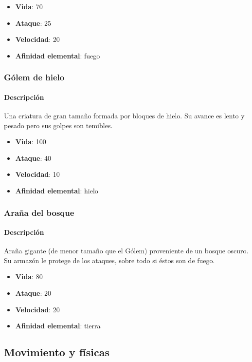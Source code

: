 \begin{itemize}
    \item \textbf{Vida}: 70
    \item \textbf{Ataque}: 25
    \item \textbf{Velocidad}: 20
    \item \textbf{Afinidad elemental}: fuego
\end{itemize}

\subsubsection{Gólem de hielo}

\paragraph{Descripción}
Una criatura de gran tamaño formada por bloques de hielo. Su avance es lento
y pesado pero sus golpes son temibles.

\begin{itemize}
    \item \textbf{Vida}: 100
    \item \textbf{Ataque}: 40
    \item \textbf{Velocidad}: 10
    \item \textbf{Afinidad elemental}: hielo
\end{itemize}

\subsubsection{Araña del bosque}

\paragraph{Descripción}
Araña gigante (de menor tamaño que el Gólem) proveniente de un bosque oscuro.
Su armazón le protege de los ataques, sobre todo si éstos son de fuego.

\begin{itemize}
    \item \textbf{Vida}: 80
    \item \textbf{Ataque}: 20
    \item \textbf{Velocidad}: 20
    \item \textbf{Afinidad elemental}: tierra
\end{itemize}

\subsection{Movimiento y físicas}
\label{sec:mec-movimiento}

